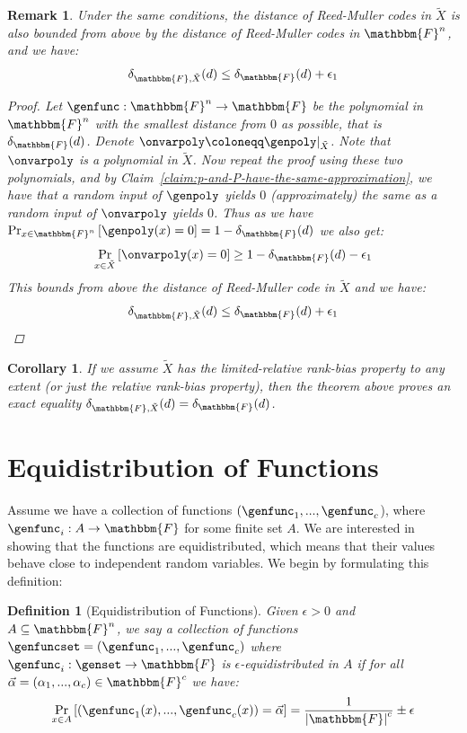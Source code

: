 \documentclass[10pt,a4paper]{article}
\newtheorem{definition}[theorem]{Definition}
\newtheorem{corollary}[theorem]{Corollary}
\newtheorem{remark}[theorem]{Remark}
\newcommand{\definedas}[0]{\coloneqq}
\newcommand{\basefield}[0]{\mathbbm{F}}
\newcommand{\blocklength}[0]{n}
\newcommand{\field}[0]{\basefield^{\blocklength}}
\newcommand{\degree}[0]{d}
\newcommand{\funcdef}[3]{#1:#2\rightarrow#3}
\newcommand{\restrictfunc}[2]{#1|_{#2}}
\newcommand{\variety}{{\tilde{X}}}
\newcommand{\abs}[1]{\left| #1 \right|}
\newcommand{\prex}[2]{\Pr_{#1}\left[ #2 \right]}
\newcommand{\normalizedcodedistance}[2]{\delta_{#1}(#2)}
\newcommand{\normalizedcodedistanceex}[3]{\delta_{#1, #2}(#3)}
\begin{document}
\begin{remark}
    Under the same conditions,
    the distance of Reed-Muller codes in $\variety$ is also bounded \emph{from above} by the distance of Reed-Muller codes in $\field$,
    and we have:
    \[
        \normalizedcodedistanceex{\basefield}{\variety}{\degree} \leq \normalizedcodedistance{\basefield}{\degree} + \epsilon_1
    \]
    \begin{proof}
        Let $\funcdef{\genfunc}{\field}{\basefield}$ be the polynomial in $\field$ with the \emph{smallest} distance from $0$ as possible, that is $\normalizedcodedistance{\basefield}{\degree}$.
        Denote $\onvarpoly \definedas \restrictfunc{\genpoly}{\variety}$.
        Note that $\onvarpoly$ is a polynomial in $\variety$.
        Now repeat the proof using these two polynomials, and by Claim~\ref{claim:p-and-P-have-the-same-approximation}, we have that a random input of $\genpoly$ yields $0$
        (approximately) the same as a random input of $\onvarpoly$ yields $0$.
        Thus as we have $\prex{x \in \field}{\genpoly(x) = 0} = 1 - \normalizedcodedistance{\basefield}{\degree}$
        we also get:
        \[
            \prex{x \in \variety}{\onvarpoly(x) = 0} \geq 1 - \normalizedcodedistance{\basefield}{\degree} - \epsilon_1
        \]
        This bounds \emph{from above} the distance of Reed-Muller code in $\variety$ and we have:
        \[
            \normalizedcodedistanceex{\basefield}{\variety}{\degree} \leq \normalizedcodedistance{\basefield}{\degree} + \epsilon_1
        \]
    \end{proof}
\end{remark}
\begin{corollary}
    If we assume $\variety$ has the limited-relative rank-bias property to \emph{any extent} (or just the relative rank-bias property),
    then the theorem above proves an exact equality $\normalizedcodedistanceex{\basefield}{\variety}{\degree} = \normalizedcodedistance{\basefield}{\degree}$.
\end{corollary}

\section[Equidistribution of Functions]{Equidistribution of Functions}\label{sec:equidistribution-of-functions}
Assume we have a collection of functions $(\genfunc_1,...,\genfunc_c$), where $\funcdef{\genfunc_i}{A}{\basefield}$ for some finite set $A$.
We are interested in showing that the functions are equidistributed, which means that their values behave close to independent random variables.
We begin by formulating this definition:
\begin{definition}[Equidistribution of Functions]
    Given $\epsilon > 0$ and $A \subseteq \field$,
    we say a collection of functions $\genfuncset = (\genfunc_1,...,\genfunc_c)$ where $\funcdef{\genfunc_i}{\genset}{\basefield}$ is $\epsilon$-equidistributed in $A$ if for all $\vec{\alpha} = (\alpha_1,...,\alpha_c) \in \basefield^c$ we have:
    \[
        \prex{x \in A}{(\genfunc_1(x),...,\genfunc_c(x)) = \vec{\alpha}} = \frac{1}{\abs{\basefield}^c} \pm \epsilon
    \]
\end{definition}
\end{document}

